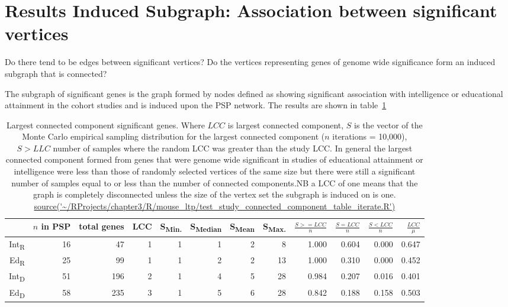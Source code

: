 \section{Results Induced Subgraph: Association between significant vertices}
Do there tend to be edges between significant vertices? Do the vertices representing genes of genome wide significance form an induced subgraph that is connected?



The subgraph of significant genes is the graph formed by nodes defined as showing significant association with intelligence or educational attainment in the cohort studies and is induced upon the PSP network. The results are shown in table~\ref{tab:Largest connected component significant genes}

\begin{table}[ht]
\centering
\begin{adjustbox}{width=\textwidth}
\setlength{\extrarowheight}{2pt}
\begin{tabular}{rrrrrrrrrrrr}
  \toprule
 & $n$ in PSP & total genes & LCC & S\textsubscript{Min.} & S\textsubscript{Median} & S\textsubscript{Mean} & S\textsubscript{Max.} & $\frac{S>=LCC}{n}$ & $\frac{S=LCC}{n}$ & $\frac{S<LCC}{n}$ & $\frac{LCC}{\mu}$ \\ 
  \midrule
Int\textsubscript{R}  & 16 & 47 & 1 & 1 & 1 & 2 & 8 & 1.000 & 0.604 & 0.000 & 0.647 \\ 
  Ed\textsubscript{R}  & 25 & 99 & 1 & 1 & 2 & 2 & 13 & 1.000 & 0.310 & 0.000 & 0.452 \\ 
   Int\textsubscript{D} & 51 & 196 & 2 & 1 & 4 & 5 & 28 & 0.984 & 0.207 & 0.016 & 0.401 \\ 
  Ed\textsubscript{D}  & 58 & 235 & 3 & 1 & 5 & 6 & 28 & 0.842 & 0.188 & 0.158 & 0.503 \\ 
   \bottomrule
\end{tabular}
\end{adjustbox}
\caption[Largest connected component of significant genes]{Largest connected component significant genes. Where $LCC$ is largest connected component, $S$ is the vector of the Monte Carlo empirical sampling distribution for the largest connected component ($n$ iterations = 10,000), $S>LLC$ number of samples where the random LCC was greater than the study LCC. In general the largest connected component formed from genes that were genome wide significant in studies of educational attainment or intelligence were less than those of randomly selected vertices of the same size but there were still a significant number of samples equal to or less than the number of connected components.NB a LCC of one means that the graph is completely disconnected unless the size of the vertex set the subgraph is induced on is one. 
\tiny\url{source('~/RProjects/chapter3/R/mouse_ltp/test_study_connected_component_table_iterate.R')}}
\label{tab:Largest connected component significant genes}
\end{table}

